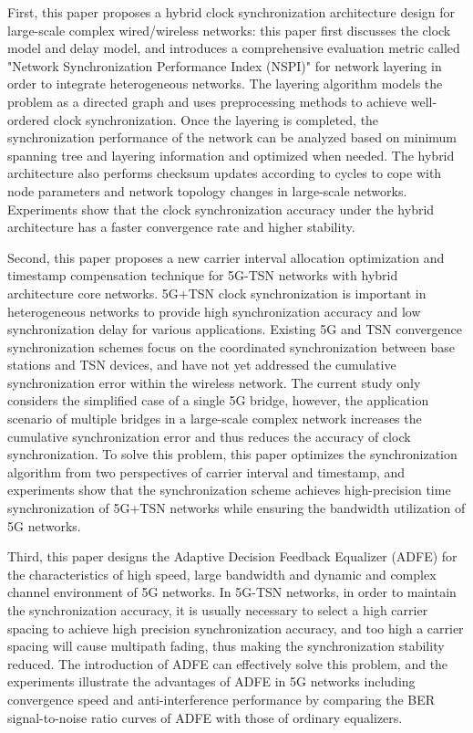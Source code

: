 \documentclass[UTF8,a4paper,12pt]{ctexart}
\numberwithin{equation}{section}
\begin{document}
First, this paper proposes a hybrid clock synchronization architecture design for large-scale complex wired/wireless networks: this paper first discusses the clock model and delay model, and introduces a comprehensive evaluation metric called "Network Synchronization Performance Index (NSPI)" for network layering in order to integrate heterogeneous networks. The layering algorithm models the problem as a directed graph and uses preprocessing methods to achieve well-ordered clock synchronization. Once the layering is completed, the synchronization performance of the network can be analyzed based on minimum spanning tree and layering information and optimized when needed. The hybrid architecture also performs checksum updates according to cycles to cope with node parameters and network topology changes in large-scale networks. Experiments show that the clock synchronization accuracy under the hybrid architecture has a faster convergence rate and higher stability.

Second, this paper proposes a new carrier interval allocation optimization and timestamp compensation technique for 5G-TSN networks with hybrid architecture core networks. 5G+TSN clock synchronization is important in heterogeneous networks to provide high synchronization accuracy and low synchronization delay for various applications. Existing 5G and TSN convergence synchronization schemes focus on the coordinated synchronization between base stations and TSN devices, and have not yet addressed the cumulative synchronization error within the wireless network. The current study only considers the simplified case of a single 5G bridge, however, the application scenario of multiple bridges in a large-scale complex network increases the cumulative synchronization error and thus reduces the accuracy of clock synchronization. To solve this problem, this paper optimizes the synchronization algorithm from two perspectives of carrier interval and timestamp, and experiments show that the synchronization scheme achieves high-precision time synchronization of 5G+TSN networks while ensuring the bandwidth utilization of 5G networks.

Third, this paper designs the Adaptive Decision Feedback Equalizer (ADFE) for the characteristics of high speed, large bandwidth and dynamic and complex channel environment of 5G networks. In 5G-TSN networks, in order to maintain the synchronization accuracy, it is usually necessary to select a high carrier spacing to achieve high precision synchronization accuracy, and too high a carrier spacing will cause multipath fading, thus making the synchronization stability reduced. The introduction of ADFE can effectively solve this problem, and the experiments illustrate the advantages of ADFE in 5G networks including convergence speed and anti-interference performance by comparing the BER signal-to-noise ratio curves of ADFE with those of ordinary equalizers.
\end{document}
